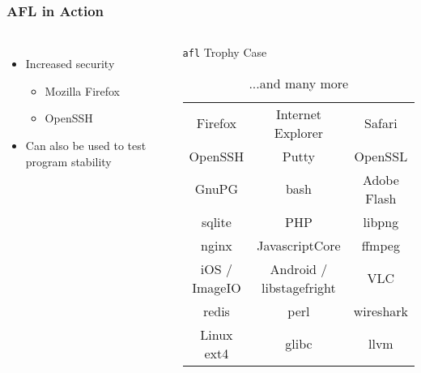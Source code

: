\begin{frame}
\frametitle{AFL in Action}

\begin{columns}


\begin{itemize}
\item{Increased security}
\begin{itemize}
\item{Mozilla Firefox}
\item{OpenSSH}
\end{itemize}
\item{Can also be used to test program stability}
\end{itemize}


\begin{center}
\begin{table}
\caption{\texttt{afl} Trophy Case}
\tiny
\begin{tabular}{c | c | c}
Firefox & Internet Explorer & Safari \\
OpenSSH & Putty & OpenSSL \\
GnuPG & bash & Adobe Flash \\
sqlite & PHP & libpng \\
nginx & JavascriptCore & ffmpeg \\
iOS / ImageIO & Android / libstagefright & VLC \\
redis & perl & wireshark \\
Linux ext4 & glibc & llvm \\
\end{tabular}
\caption*{...and many more}
\end{table}
\end{center}

\end{columns}
\end{frame}
